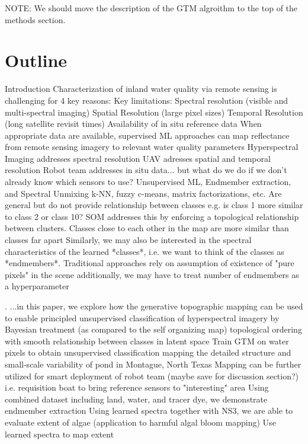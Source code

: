 \documentclass{article}
\begin{document}
NOTE: We should move the description of the GTM algroithm to the top of the methods section.

\section*{Outline}
\begin{outline}[enumerate]
\1 Introduction
    \2 Characterization of inland water quality via remote sensing is challenging for 4 key reasons:
        \3 Key limitations:
            \4 Spectral resolution (visible and multi-spectral imaging)
            \4 Spatial Resolution (large pixel sizes)
            \4 Temporal Resolution (long satellite revisit times)
            \4 Availability of in situ reference data
        \3 When appropriate data are available, supervised ML approaches can map reflectance from remote sensing imagery to relevant water quality parameters
    \2 Hyperspectral Imaging addresses spectral resolution
    \2 UAV adresses spatial and temporal resolution
    \2 Robot team addresses in situ data... but what do we do if we don't already know which sensors to use? 
    \2 Unsupervised ML, Endmember extraction, and Spectral Unmixing
        \3 k-NN, fuzzy c-means, matrix factorizations, etc.
            \4 Are general but do not provide relationship between classes e.g. is class 1 more similar to class 2 or class 10?
        \3 SOM addresses this by enforcing a topological relationship between clusters. Classes close to each other in the map are more similar than classes far apart
        \3 Similarly, we may also be interested in the spectral characteristics of the learned *classes*, i.e. we want to think of the classes as *endmembers*.
            \4 Traditional approaches rely on assumption of existence of "pure pixels" in the scene
            \4 additionally, we may have to treat number of endmembers as a hyperparameter

    \2. ...in this paper, we explore how the generative topographic mapping can be used to
        \3 enable principled unsupervised classification of hyperspectral imagery by
            \4 Bayesian treatment (as compared to the self organizing map)
            \4 topological ordering with smooth relationship between classes in latent space
        \3 Train GTM on water pixels to obtain unsupervised classification mapping the detailed structure and small-scale variability of pond in Montague, North Texas
        \3 Mapping can be further utilized for smart deployment of robot team (maybe save for discussion section?) i.e. requisition boat to bring reference sensors to "interesting" area
        \3 Using combined dataset including land, water, and tracer dye, we demonstrate endmember extraction
        \3 Using learned spectra together with NS3, we are able to evaluate extent of algae (application to harmful algal bloom mapping)
        \3 Use learned spectra to map extent



\end{outline}
\end{document}
